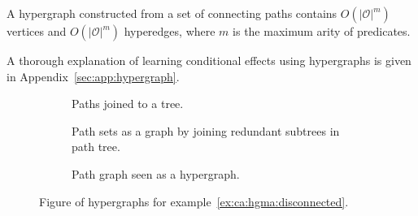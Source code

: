 \documentclass[\master/Master.tex]{subfiles}
\begin{document}
A hypergraph constructed from a set of connecting paths contains $O\left(|\mathcal{O}|^m\right)$ vertices and $O\left( |\mathcal{O}|^m\right)$ hyperedges, where $m$ is the maximum arity of predicates. 

A thorough explanation of learning conditional effects using hypergraphs is given in Appendix~\ref{sec:app:hypergraph}.



\begin{figure}
    \centering
    \begin{subfigure}[t]{0.30\textwidth}
        \centering
        \raisebox{-0.5\height}{\resizebox{\linewidth}{!}{}}
        \caption{Paths joined to a tree.}
        \label{fig:ca:graphExTree}
    \end{subfigure}%
    \hfill%
    \begin{subfigure}[t]{0.30\textwidth}
        \centering
        \resizebox{1\linewidth}{!}{\raisebox{-0.5\height}{}}
        \caption{Path sets as a graph by joining redundant subtrees in path tree.}
        \label{fig:ca:graphExGraph}
    \end{subfigure}
    \hfill%
    \begin{subfigure}[t]{0.30\textwidth}
        \centering
        \resizebox{1\linewidth}{!}{\raisebox{-0.5\height}{}}
        \caption{Path graph seen as a hypergraph.}
        \label{fig:ca:graphExHG}
    \end{subfigure}
    \caption{Figure of hypergraphs for example~\ref{ex:ca:hgma:disconnected}.}\label{fig:ex:ca:hgma:ex:disconnected}
\end{figure}
%
\end{document}
